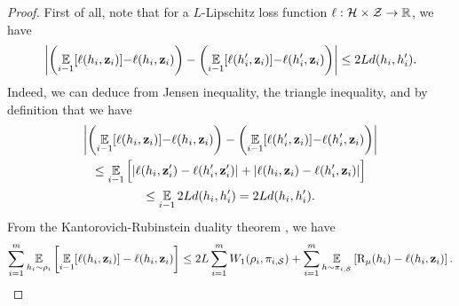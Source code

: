 \documentclass{article}
\begin{document}
\theoremonlineht*
\begin{proof}
First of all, note that for a $L$-Lipschitz loss function $\ell: \mathcal{H}\times\mathcal{Z}\to\mathbb{R}$, we have
\begin{align}
\left\vert\left( \operatorname*{\mathbb{E}}_{i-1}[\ell(h_i,\mathbf{z}_i)]{-}\ell(h_i, \mathbf{z}_i)\right) - \left( \operatorname*{\mathbb{E}}_{i-1}[\ell(h'_i,\mathbf{z}_i)]{-}\ell(h'_i, \mathbf{z}_i)\right)\right\vert \le 2Ld(h_i, h'_i).\label{eq:proof-online-ht-1}
\end{align}
Indeed, we can deduce  from Jensen inequality, the triangle inequality, and by definition that we have
\begin{multline*}
\left\vert\left(\operatorname*{\mathbb{E}}_{i-1}[\ell(h_i,\mathbf{z}_i)]{-}\ell(h_i, \mathbf{z}_i)\right) - \left(\operatorname*{\mathbb{E}}_{i-1}[\ell(h'_i,\mathbf{z}_i)]{-}\ell(h'_i, \mathbf{z}_i)\right)\right\vert \\ 
\le \operatorname*{\mathbb{E}}_{i-1}\Big[ |\ell(h_i, \mathbf{z}'_i)-\ell(h'_i, \mathbf{z}'_i)|+|\ell(h_i, \mathbf{z}_i)-\ell(h'_i, \mathbf{z}_i)|\Big]\\
 \le \operatorname*{\mathbb{E}}_{i-1} 2Ld(h_i, h'_i) = 2Ld(h_i, h'_i).
\end{multline*}
From the Kantorovich-Rubinstein duality theorem \cite[Remark 6.5]{villani2009optimal}, we have
\begin{align*}
\sum_{i=1}^{m}\operatorname*{\mathbb{E}}_{h_i\sim\rho_{i}}\left[\operatorname*{\mathbb{E}}_{i-1}[\ell(h_i,\mathbf{z}_i)]-\ell(h_i, \mathbf{z}_i) \right] \le 2L\sum_{i=1}^{m}W_1(\rho_{i}, \pi_{i,\mathcal{S}}) + \sum_{i=1}^{m}\operatorname*{\mathbb{E}}_{h\sim\pi_{i,\mathcal{S}}}\left[\text{R}_{\mu}(h_i)-\ell(h_i, \mathbf{z}_i) \right].
\end{align*}


\end{proof}
\end{document}
